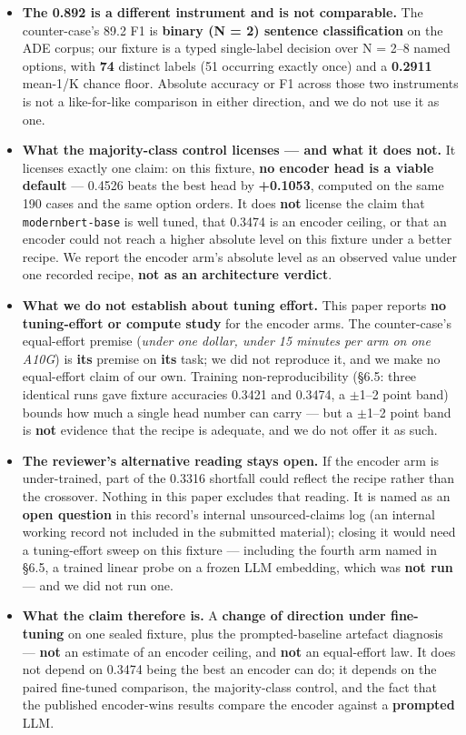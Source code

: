 \documentclass[10pt]{article}
\begin{document}
\begin{itemize}
\item \textbf{The 0.892 is a different instrument and is not comparable.} The counter-case's 89.2 F1 is \textbf{binary (N = 2) sentence classification} on the ADE corpus; our fixture is a typed single-label decision over N = 2--8 named options, with \textbf{74} distinct labels (51 occurring exactly once) and a \textbf{0.2911} mean-1/K chance floor. Absolute accuracy or F1 across those two instruments is not a like-for-like comparison in either direction, and we do not use it as one.
\item \textbf{What the majority-class control licenses --- and what it does not.} It licenses exactly one claim: on this fixture, \textbf{no encoder head is a viable default} --- 0.4526 beats the best head by \textbf{+0.1053}, computed on the same 190 cases and the same option orders. It does \textbf{not} license the claim that \texttt{modernbert-base} is well tuned, that 0.3474 is an encoder ceiling, or that an encoder could not reach a higher absolute level on this fixture under a better recipe. We report the encoder arm's absolute level as an observed value under one recorded recipe, \textbf{not as an architecture verdict}.
\item \textbf{What we do not establish about tuning effort.} This paper reports \textbf{no tuning-effort or compute study} for the encoder arms. The counter-case's equal-effort premise (\emph{under one dollar, under 15 minutes per arm on one A10G}) is \textbf{its} premise on \textbf{its} task; we did not reproduce it, and we make no equal-effort claim of our own. Training non-reproducibility (\S6.5: three identical runs gave fixture accuracies 0.3421 and 0.3474, a $\pm$1--2 point band) bounds how much a single head number can carry --- but a $\pm$1--2 point band is \textbf{not} evidence that the recipe is adequate, and we do not offer it as such.
\item \textbf{The reviewer's alternative reading stays open.} If the encoder arm is under-trained, part of the 0.3316 shortfall could reflect the recipe rather than the crossover. Nothing in this paper excludes that reading. It is named as an \textbf{open question} in this record's internal unsourced-claims log (an internal working record not included in the submitted material); closing it would need a tuning-effort sweep on this fixture --- including the fourth arm named in \S6.5, a trained linear probe on a frozen LLM embedding, which was \textbf{not run} --- and we did not run one.
\item \textbf{What the claim therefore is.} A \textbf{change of direction under fine-tuning} on one sealed fixture, plus the prompted-baseline artefact diagnosis --- \textbf{not} an estimate of an encoder ceiling, and \textbf{not} an equal-effort law. It does not depend on 0.3474 being the best an encoder can do; it depends on the paired fine-tuned comparison, the majority-class control, and the fact that the published encoder-wins results compare the encoder against a \textbf{prompted} LLM.
\end{itemize}
\end{document}
